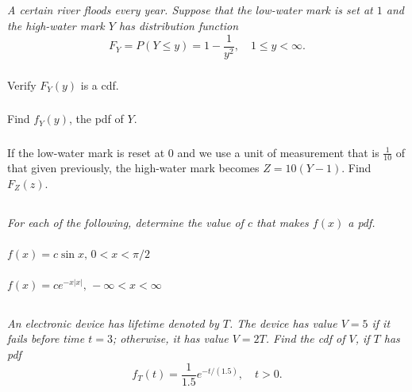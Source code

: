 \documentclass[12pt]{amsart}
\begin{document}
\subsection{} %
\textit{A certain river floods every year. Suppose that the low-water mark is set at \(1\) and the
	high-water mark \(Y\) has distribution function}
	\[ F_Y = P(Y\leq y) = 1-\frac{1}{y^2}, \quad 1\leq y<\infty. \]
	\subsubsection{} Verify \(F_Y(y)\) is a cdf.
	
	\subsubsection{} Find \(f_Y(y)\), the pdf of \(Y\).
	
	\subsubsection{} If the low-water mark is reset at \(0\) and we use a unit of measurement that is $\frac{1}{10}$ of
		that given previously, the high-water mark becomes \(Z = 10(Y − 1)\). Find \(F_Z(z)\).
		


\subsection{} %
\textit{For each of the following, determine the value of $c$ that makes $f(x)$ a pdf.}
	\subsubsection{}
	\( f(x) = c\sin x,\, 0<x<\pi/2 \)
	
	\subsubsection{}
	\( f(x) = ce^{-x|x|},\, -\infty<x<\infty \)
	


\subsection{} %
\textit{An electronic device has lifetime denoted by $T$. The device has value $V = 5$ if it fails
	before time $t = 3$; otherwise, it has value $V = 2T$. Find the cdf of $V$, if $T$ has pdf}
	\[ f_T(t) = \frac{1}{1.5}e^{-t/(1.5)},\quad t>0.\]
\end{document}

